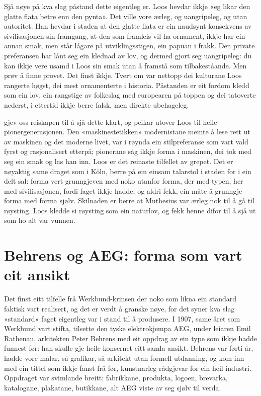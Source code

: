 Sjå nøye på kva slag påstand dette eigentleg er. Loos hevdar ikkje «eg likar den glatte flata betre enn den pynta». Det ville vore ærleg, og uangripeleg, og utan autoritet. Han hevdar i staden at den glatte flata er ein naudsynt konsekvens av sivilisasjonen sin framgang, at den som framleis vil ha ornament, ikkje har ein annan smak, men står lågare på utviklingsstigen, ein papuan i frakk. Den private preferansen har lånt seg ein klednad av lov, og dermed gjort seg uangripeleg: du kan ikkje vere usamd i Loos sin smak utan å framstå som tilbakeståande. Men prøv å finne provet. Det finst ikkje. Tvert om var nettopp dei kulturane Loos rangerte høgst, dei mest ornamenterte i historia. Påstanden er eit fordom kledd som ein lov, ein rangstige av folkeslag med europearen på toppen og dei tatoverte nederst, i ettertid ikkje berre falsk, men direkte ubehageleg.

\textcite{banham1960} gjev oss reiskapen til å sjå dette klart, og peikar utover Loos til heile pionergenerasjonen. Den «maskinestetikken» modernistane meinte å lese rett ut av maskinen og det moderne livet, var i røynda ein stilpreferanse som vart vald fyrst og rasjonalisert etterpå; pionerane såg ikkje forma i maskinen, dei tok med seg ein smak og las han inn. Loos er det reinaste tilfellet av grepet. Det er nøyaktig same draget som i Köln, berre på ein einsam talarstol i staden for i ein delt sal: forma vert grunngjeven med noko utanfor forma, der med typen, her med sivilisasjonen, fordi faget ikkje hadde, og aldri fekk, ein måte å grunngje forma med forma sjølv. Skilnaden er berre at Muthesius var ærleg nok til å gå til røysting. Loos kledde si røysting som ein naturlov, og fekk henne difor til å sjå ut som ho alt var vunnen.

\section{Behrens og AEG: forma som vart eit ansikt}

Det finst eitt tilfelle frå Werkbund-krinsen der noko som likna ein standard faktisk vart realisert, og det er verdt å granske nøye, for det syner kva slag «standard» faget eigentleg var i stand til å produsere. I 1907, same året som Werkbund vart stifta, tilsette den tyske elektrokjempa AEG, under leiaren Emil Rathenau, arkitekten Peter Behrens med eit oppdrag av ein type som ikkje hadde funnest før: han skulle gje heile konsernet eitt samla ansikt. Behrens var førti år, hadde vore målar, så grafikar, så arkitekt utan formell utdanning, og kom inn med ein tittel som ikkje fanst frå før, kunstnarleg rådgjevar for ein heil industri. Oppdraget var svimlande breitt: fabrikkane, produkta, logoen, brevarka, katalogane, plakatane, butikkane, alt AEG viste av seg sjølv til verda.

